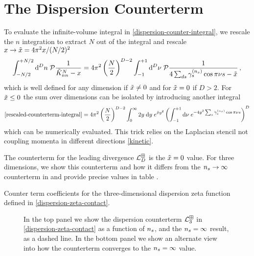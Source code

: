 \section{The Dispersion Counterterm}
\label{sec:dispersion-counterterm}

To evaluate the infinite-volume integral in \eqref{dispersion-counter-integral}, we rescale the $n$ integration to extract $N$ out of the integral and rescale  $x \to \tilde{x} = 4 \pi^2  x/(N/2)^2$
\begin{align}\label{eq:rescaled-counterterm-integral}
    \int_{-N/2}^{+N/2} \mathrm{d}^Dn\; \mathcal{P} \frac{1}{\tilde K_{nn}^N - x}
    =
    4\pi^2 \left(\frac{N}{2}\right)^{D-2} \int_{-1}^{+1} \mathrm{d}^D\nu\; \mathcal{P} \frac{1}{4\sum_{ds} \gamma^{({n_s})}_s \cos \pi \nu s - \tilde{x}}
    \, ,
\end{align}
which is well defined for any dimension if $\tilde{x}\neq0$ and for $\tilde{x}=0$ if $D>2$.
For $\tilde{x}\leq0$ the sum over dimensions can be isolated by introducing another integral
\begin{equation}
    \label{eq:dispersion counterterm}
    \eqref{rescaled-counterterm-integral}
    =
    4 \pi^2 \left(\frac{N}{2}\right)^{D-2}\int_{0}^{\infty} 2y\; \mathrm{d}y\; e^{\xtilde y^2}\left(\int_{-1}^{+1} \mathrm{d}\nu\; e^{-4y^2 \sum_s \gamma_s^{(\nstep)} \cos \pi \nu s}\right)^D
\end{equation}
which can be numerically evaluated.
This trick relies on the Laplacian stencil not coupling momenta in different directions \eqref{kinetic}.

The counterterm for the leading divergence $\mathcal{L}_D^{\boxplus}$ is the $\tilde{x}=0$ value.
For three dimensions, we show this counterterm and how it differs from the ${n_s} \to \infty$ counterterm in  and provide precise values in table .
\begin{table}[htb]
    
    \caption{
    	\label{tab:diserpersion-zeta-3d-counterterm-counterterm}
		Counter term coefficients for the three-dimensional dispersion zeta function defined in \eqref{dispersion-zeta-contact}.
    }
\end{table}

\begin{figure}[htb]
    \scalebox{0.9}{}
    \caption{
    	In the top panel we show the dispersion counterterm $\mathcal{L}^{\boxplus}_{3}$ in \eqref{dispersion-zeta-contact} as a function of ${n_s}$, and the ${n_s}=\infty$ result, as a dashed line.
	In the bottom panel we show an alternate view into how the counterterm converges to the ${n_s}=\infty$ value.
    }
    \label{fig:nstep counterterm}
\end{figure}

